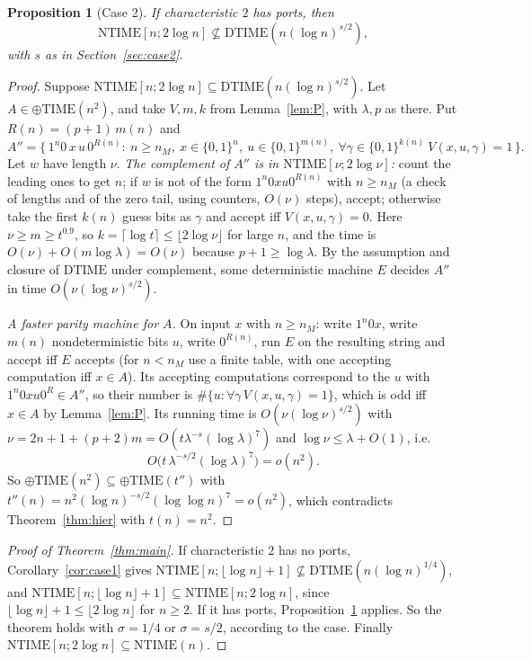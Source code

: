\documentclass[11pt]{article}
\newtheorem{proposition}[theorem]{Proposition}
\theoremstyle{definition}
\theoremstyle{remark}
\newcommand{\DTIME}{\mathrm{DTIME}}
\newcommand{\NTIME}{\mathrm{NTIME}}
\newcommand{\parTIME}{\oplus\mathrm{TIME}}
\begin{document}
\begin{proposition}[Case 2]\label{prop:case2}
If characteristic $2$ has ports, then
\[\NTIME[n;2\log n]\not\subseteq\DTIME(n(\log n)^{s/2}),\]
with $s$ as in Section~\ref{sec:case2}.
\end{proposition}
\begin{proof}
Suppose $\NTIME[n;2\log n]\subseteq\DTIME(n(\log n)^{s/2})$. Let $A\in\parTIME(n^2)$, and take $V,m,k$ from Lemma~\ref{lem:P}, with
$\lambda,p$ as there. Put $R(n)=(p+1)\,m(n)$ and
\[
 A''=\bigl\{\,1^n0\,x\,u\,0^{R(n)}:\ n\ge n_M,\ x\in\{0,1\}^n,\ u\in\{0,1\}^{m(n)},\ \forall\gamma\in\{0,1\}^{k(n)}\
 V(x,u,\gamma)=1\,\bigr\}.
\]
Let $w$ have length $\nu$. \emph{The complement of $A''$ is in $\NTIME[\nu;2\log\nu]$:} count the leading ones to get $n$; if $w$ is
not of the form $1^n0xu0^{R(n)}$ with $n\ge n_M$ (a check of lengths and of the zero tail, using counters, $O(\nu)$ steps), accept;
otherwise take the first $k(n)$ guess bits as $\gamma$ and accept iff $V(x,u,\gamma)=0$. Here $\nu\ge m\ge t^{0.9}$, so
$k=\lceil\log t\rceil\le\lfloor2\log\nu\rfloor$ for large $n$, and the time is $O(\nu)+O(m\log\lambda)=O(\nu)$ because
$p+1\ge\log\lambda$. By the assumption and closure of $\DTIME$ under complement, some deterministic machine $E$ decides $A''$ in time
$O(\nu(\log\nu)^{s/2})$.

\emph{A faster parity machine for $A$.} On input $x$ with $n\ge n_M$: write $1^n0x$, write $m(n)$ nondeterministic bits $u$, write
$0^{R(n)}$, run $E$ on the resulting string and accept iff $E$ accepts (for $n<n_M$ use a finite table, with one accepting
computation iff $x\in A$). Its accepting computations correspond to the $u$ with $1^n0xu0^{R}\in A''$, so their number is
$\#\{u:\forall\gamma\,V(x,u,\gamma)=1\}$, which is odd iff $x\in A$ by Lemma~\ref{lem:P}. Its running time is
$O(\nu(\log\nu)^{s/2})$ with $\nu=2n+1+(p+2)m=O(t\lambda^{-s}(\log\lambda)^7)$ and $\log\nu\le\lambda+O(1)$, i.e.
\[
 O\bigl(t\,\lambda^{-s/2}(\log\lambda)^7\bigr)=o(n^2).
\]
So $\parTIME(n^2)\subseteq\parTIME(t'')$ with $t''(n)=n^2(\log n)^{-s/2}(\log\log n)^7=o(n^2)$, which contradicts
Theorem~\ref{thm:hier} with $t(n)=n^2$.
\end{proof}

\begin{proof}[Proof of Theorem~\ref{thm:main}]
If characteristic $2$ has no ports, Corollary~\ref{cor:case1} gives $\NTIME[n;\lfloor\log n\rfloor+1]\not\subseteq\DTIME(n(\log n)^{1/4})$, and
$\NTIME[n;\lfloor\log n\rfloor+1]\subseteq\NTIME[n;2\log n]$, since $\lfloor\log n\rfloor+1\le\lfloor2\log n\rfloor$ for $n\ge2$. If it has ports, Proposition~\ref{prop:case2} applies. So the theorem
holds with $\sigma=1/4$ or $\sigma=s/2$, according to the case. Finally $\NTIME[n;2\log n]\subseteq\NTIME(n)$.
\end{proof}
\end{document}
